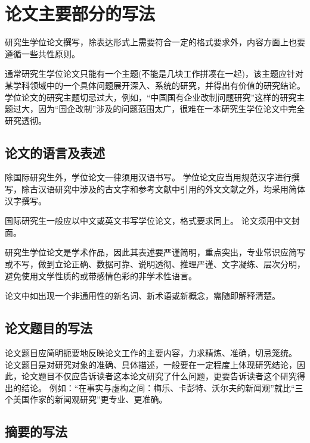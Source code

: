
\chapter{论文主要部分的写法}

研究生学位论文撰写，除表达形式上需要符合一定的格式要求外，内容方面上也要遵循一些共性原则\citep{aaas1883science,atkinson1982experimental}。

通常研究生学位论文只能有一个主题(不能是几块工作拼凑在一起)，该主题应针对某学科领域中的一个具体问题展开深入、系统的研究，并得出有价值的研究结论。
学位论文的研究主题切忌过大，例如，“中国国有企业改制问题研究”这样的研究主题过大，因为“国企改制”涉及的问题范围太广，很难在一本研究生学位论文中完全研究透彻。



\section{论文的语言及表述}

除国际研究生外，学位论文一律须用汉语书写。
学位论文应当用规范汉字进行撰写，除古汉语研究中涉及的古文字和参考文献中引用的外文文献之外，均采用简体汉字撰写\citep{carlson1981two,dupont1974bone,zhangkun1994}。

国际研究生一般应以中文或英文书写学位论文，格式要求同上。
论文须用中文封面。

研究生学位论文是学术作品，因此其表述要严谨简明，重点突出，专业常识应简写或不写，做到立论正确、数据可靠、说明透彻、推理严谨、文字凝练、层次分明，避免使用文学性质的或带感情色彩的非学术性语言。

论文中如出现一个非通用性的新名词、新术语或新概念，需随即解释清楚。



\section{论文题目的写法}

论文题目应简明扼要地反映论文工作的主要内容，力求精炼、准确，切忌笼统。
论文题目是对研究对象的准确、具体描述，一般要在一定程度上体现研究结论，因此，论文题目不仅应告诉读者这本论文研究了什么问题，更要告诉读者这个研究得出的结论。
例如：“在事实与虚构之间：梅乐、卡彭特、沃尔夫的新闻观”就比“三个美国作家的新闻观研究”更专业、更准确。



\section{摘要的写法}

